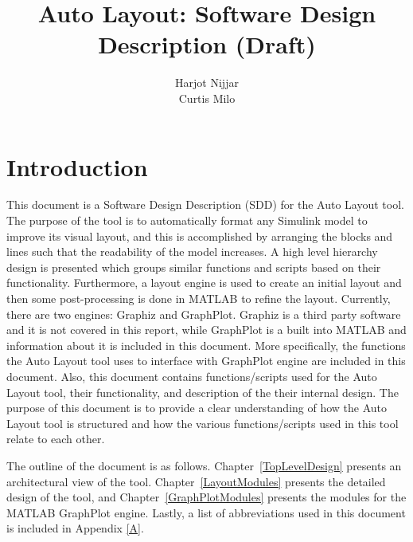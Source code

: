 \documentclass[12pt,letterpaper]{report}
\newcommand{\tool}{Auto Layout\xspace}
\begin{document}
  
  \title{\tool: Software Design Description (Draft)}
  
  \author{
    Harjot Nijjar\\
    Curtis Milo \\
  }
  
  \maketitle
  
  \tableofcontents

\chapter{Introduction}

\par This document is a Software Design Description (SDD) for the \tool tool. The purpose of the tool is to automatically format any Simulink model to improve its visual layout, and this is accomplished by arranging the blocks and lines such that the readability of the model increases. A high level hierarchy design is presented which groups similar functions and scripts based on their functionality. Furthermore, a layout engine is used to create an initial layout and then some post-processing is done in MATLAB to refine the layout. Currently, there are two engines: Graphiz and GraphPlot. Graphiz is a third party software and it is not covered in this report, while GraphPlot is a built into MATLAB and information about it is included in this document. More specifically, the functions the \tool tool uses to interface with GraphPlot engine are included in this document. Also, this document contains functions/scripts used for the \tool tool, their functionality, and description of the their internal design. The purpose of this document is to provide a clear understanding of how the \tool tool is structured and how the various functions/scripts used in this tool relate to each other.

\par The outline of the document is as follows. Chapter~\ref{TopLevelDesign} presents an architectural view of the tool. Chapter~\ref{LayoutModules} presents the detailed design of the tool, and Chapter~\ref{GraphPlotModules} presents the modules for the MATLAB GraphPlot engine. Lastly, a list of abbreviations used in this document is included in Appendix \ref{A}.
\end{document}

